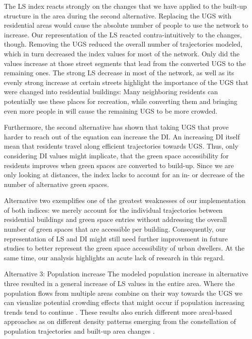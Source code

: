 \documentclass[10pt]{article}
\begin{document}
The LS index reacts strongly on the changes that we have applied to the built-up structure in the area during the second alternative.
Replacing the UGS with residential areas would cause the absolute number of people to use the network to increase. 
Our representation of the LS reacted contra-intuitively to the changes, though.
Removing the UGS reduced the overall number of trajectories modeled, which in turn decreased the index values for most of the network.
Only did the values increase at those street segments that lead from the converted UGS to the remaining ones.
The strong LS decrease in most of the network, as well as its evenly strong increase at certain streets highlight the importance of the UGS that were changed into residential buildings: Many neighboring residents can potentially use these places for recreation, while converting them and bringing even more people in will cause the remaining UGS to be more crowded.

Furthermore, the second alternative has shown that taking UGS that prove harder to reach out of the equation can increase the DI.
An increasing DI itself mean that residents travel along efficient trajectories towards UGS.
Thus, only considering DI values might implicate, that the green space accessibility for residents improves when green spaces are converted to build-up.
Since we are only looking at distances, the index lacks to account for an in- or decrease of the number of alternative green spaces.

Alternative two exemplifies one of the greatest weaknesses of our implementation of both indices: we merely account for the individual trajectories between residential buildings and green space entries without addressing the overall number of green spaces that are accessible per building. 
Consequently, our representation of LS and DI might still need further improvement in future studies to better represent the green space accessibility of urban dwellers.
At the same time, our analysis highlights an acute lack of research in this regard.

Alternative 3: Population increase
The modeled population increase in alternative three resulted in a general increase of LS values in the entire area. 
Where the population flows from multiple areas combine on their way towards the UGS we can visualize potential crowding effects that might occur if population increasing trends tend to continue \citep{Cortinovis.2022}.
These results also enrich different more areal-based approaches as on different density patterns emerging from the constellation of population trajectories and built-up area changes \citep{Wolff.2017}.
\end{document}
